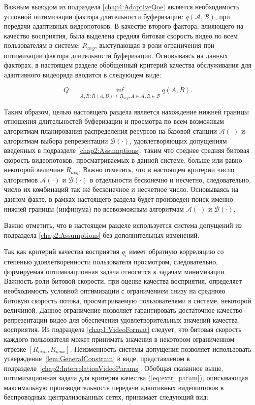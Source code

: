 Важным выводом из подраздела \ref{chap4:AdaptiveQoe} является необходимость условной оптимизации фактора длительности буферизации: $\bar{q}\left(\mathcal{A}, \mathcal{B}\right)$, при передачи адаптивных видеопотоков. В качестве второго фактора, влияющего на качество восприятия, была выделена средняя битовая скорость видео по всем пользователям в системе: $R_{avg}$, выступающая в роли ограничения при оптимизации фактора длительности буферизации. Основываясь на данных факторах, в настоящем разделе обобщенный критерий качества обслуживания для адаптивного видеоряда вводится в следующем виде:

\begin{equation}
Q = \inf\limits_{A,B: \overline{R}\left(A,B\right) \geq R_{avg}, A \in \mathcal{A}, B \in \mathcal{B}} \overline{q}\left(A,B\right).
\label{eq:extr_param}
\end{equation}

Таким образом, целью настоящего раздела является нахождение нижней границы отношения длительностей буферизации и просмотра по всем возможным алгоритмам планирования распределения ресурсов на базовой станции $\mathcal{A}(\cdot)$ и алгоритмам выбора репрезентации $\mathcal{B}(\cdot)$, удовлетворяющих допущениям введенных в подразделе \ref{chap2:Assumptions}, таким что среднее средняя битовая скорость видеопотоков, просматриваемых в данной системе, больше или равно некоторой величине $R_{avg}$. Важно отметить, что в настоящем критерии число алгоритмов $\mathcal{A}(\cdot)$ и $\mathcal{B}(\cdot)$ в отдельности бесконечно и несчетно, следовательно, число их комбинаций так же бесконечное и несчетное число. Основываясь на данном факте, в рамках настоящего раздела будет произведен поиск именно нижней границы (инфинума) по всевозможным алгоритмам $\mathcal{A}(\cdot)$ и $\mathcal{B}(\cdot)$.

Важно отметить, что в настоящем разделе используется система допущений из подраздела \ref{chap2:Assumptions} без дополнительных изменений.

Так как критерий качества восприятия $q_i$ имеет обратную корреляцию со степенью удовлетворенности пользователя просмотром, следовательно, формируемая оптимизационная задача относится к задачам минимизации. Важность роли битовой скорости, при оценке качества восприятия, определяет необходимость условной оптимизации с ограничением снизу на среднюю битовую скорость потока, просматриваемую пользователями в системе, некоторой величиной. Данное ограничение позволяет гарантировать достаточное качество репрезентации видео для обеспечения удовлетворительных значений качества восприятия. Из подраздела \ref{chap1:VideoFormat} следует, что битовая скорость каждого пользователя может принимать значения в некотором ограниченном отрезке $[R_{min}, R_{max}]$. Неизменность системы допущения позволяет использовать утверждение~\ref{lem:GeneralConstrain} в виде, представленом в подразделе~\ref{chap2:InterrelationVideoParams}. Обобщая сказанное выше, оптимизационная задача для критерия качества (\ref{eq:extr_param}), описывающая максимальную производительность передачи адаптивных видеопотоков в беспроводных централизованных сетях, принимает следующий вид:

